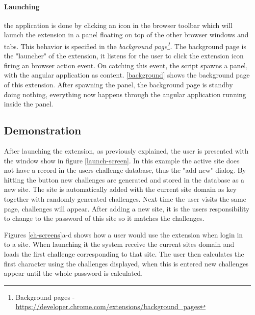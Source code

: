 \paragraph{Launching} the application is done by clicking an icon in the browser toolbar which will launch the extension in a panel floating on top of the other browser windows and tabs. This behavior is specified in the \emph{background page\footnote{Background pages - \url{https://developer.chrome.com/extensions/background_pages}}}. The background page is the "launcher" of the extension, it listens for the user to click the extension icon firing an browser action event. On catching this event, the script spawns a panel, with the angular application as content. \autoref{background} shows the background page of this extension. After spawning the panel, the background page is standby doing nothing, everything now happens through the angular application running inside the panel. 



\subsection{Demonstration}\label{demo}
After launching the extension, as previously explained, the user is presented with the window show in figure \ref{launch-screen}. In this example the active site does not have a record in the users challenge database, thus the "add new" dialog. By hitting the button new challenges are generated and stored in the database as a new site. The site is automatically added with the current site domain as key together with randomly generated challenges. Next time the user visits the same page, challenges will appear. After adding a new site, it is the users responsibility to change to the password of this site so it matches the challenges.

\par Figures \ref{ch-screens}a-d shows how a user would use the extension when login in to a site. When launching it the system receive the current sites domain and loads the first challenge corresponding to that site. The user then calculates the first character using the challenges displayed, when this is entered new challenges appear until the whole password is calculated. 

